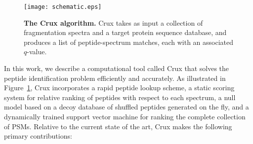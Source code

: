 \documentclass[12pt]{article}
\begin{document}
\begin{figure}
\centering
\texttt{[image: schematic.eps]}
\caption{{\bf The Crux algorithm.}  Crux takes as input a collection
  of fragmentation spectra and a target protein sequence database, and
  produces a list of peptide-spectrum matches, each with an associated
  $q$-value.
  \label{figure:crux}}
\end{figure}

In this work, we describe a computational tool called Crux that solves
the peptide identification problem efficiently and accurately.  As
illustrated in Figure~\ref{figure:crux}, Crux incorporates a rapid
peptide lookup scheme, a static scoring system for relative ranking of
peptides with respect to each spectrum, a null model based on a decoy
database of shuffled peptides generated on the fly, and a dynamically
trained support vector machine for ranking the complete collection of
PSMs.  Relative to the current state of the art, Crux makes the
following primary contributions:
\end{document}
